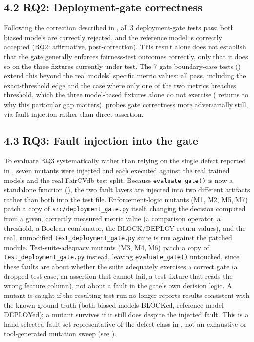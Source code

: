 \documentclass[]{einformatica}
\begin{document}
\subsection*{4.2 RQ2: Deployment-gate correctness}\label{sec:Results-RQ2}

Following the correction described in , all 3 deployment-gate tests pass: both biased models are correctly rejected, and the reference model is correctly accepted (RQ2: affirmative, post-correction). This result alone does not establish that the gate generally enforces fairness-test outcomes correctly, only that it does so on the three fixtures currently under test. The 7 gate boundary-case tests () extend this beyond the real models' specific metric values: all pass, including the exact-threshold edge and the case where only one of the two metrics breaches threshold, which the three model-based fixtures alone do not exercise ( returns to why this particular gap matters).  probes gate correctness more adversarially still, via fault injection rather than direct assertion.

\subsection*{4.3 RQ3: Fault injection into the gate}\label{sec:Results-RQ3}

To evaluate RQ3 systematically rather than relying on the single defect reported in , seven mutants were injected and each executed against the real trained models and the real FairCVdb test split. Because \texttt{evaluate\_gate()} is now a standalone function (), the two fault layers are injected into two different artifacts rather than both into the test file. Enforcement-logic mutants (M1, M2, M5, M7) patch a copy of \texttt{src/deployment\_gate.py} itself, changing the decision computed from a given, correctly measured metric value (a comparison operator, a threshold, a Boolean combinator, the BLOCK/DEPLOY return values), and the real, unmodified \texttt{test\_deployment\_gate.py} suite is run against the patched module. Test-suite-adequacy mutants (M3, M4, M6) patch a copy of \texttt{test\_deployment\_gate.py} instead, leaving \texttt{evaluate\_gate()} untouched, since these faults are about whether the suite adequately exercises a correct gate (a dropped test case, an assertion that cannot fail, a test fixture that reads the wrong feature column), not about a fault in the gate's own decision logic. A mutant is caught if the resulting test run no longer reports results consistent with the known ground truth (both biased models BLOCKed, reference model DEPLOYed); a mutant survives if it still does despite the injected fault. This is a hand-selected fault set representative of the defect class in , not an exhaustive or tool-generated mutation sweep (see ).
\end{document}
